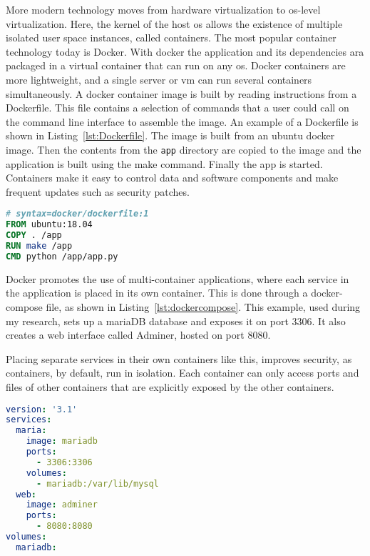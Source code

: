 More modern technology moves from hardware virtualization to \gls{os}-level virtualization.
Here, the kernel of the host \gls{os} allows the existence of multiple isolated user space instances, called containers.
The most popular container technology today is Docker.
With docker the application and its dependencies ara packaged in a virtual container that can run on any \gls{os}.
Docker containers are more lightweight, and a single server or \gls{vm} can run several containers simultaneously.
A docker container image is built by reading instructions from a Dockerfile.
This file contains a selection of commands that a user could call on the command line interface to assemble the image.
An example of a Dockerfile is shown in Listing~\ref{lst:Dockerfile}.
The image is built from an ubuntu docker image. Then the contents from the \texttt{app} directory are copied to the image and the application is built using the make command. Finally the app is started.
Containers make it easy to control data and software components and make frequent updates such as security patches.

\begin{lstlisting}[language={Dockerfile},caption={Example of a Dockerfile to build and run a Python application.},label={lst:Dockerfile},xleftmargin=15pt]
# syntax=docker/dockerfile:1
FROM ubuntu:18.04
COPY . /app
RUN make /app
CMD python /app/app.py
\end{lstlisting}

Docker promotes the use of multi-container applications, where each service in the application is placed in its own container.
This is done through a docker-compose file, as shown in Listing~\ref{lst:dockercompose}.
This example, used during my research, sets up a mariaDB database and exposes it on port 3306. It also creates a web interface called Adminer, hosted on port 8080.

Placing separate services in their own containers like this, improves security, as containers, by default, run in isolation.
Each container can only access ports and files of other containers that are explicitly exposed by the other containers.

\begin{minipage}[t]{0.9\linewidth}
\begin{lstlisting}[language={YAML},caption={Example of a Dockerfile to build and run a Python application.},label={lst:dockercompose},xleftmargin=15pt]
version: '3.1'
services:
  maria:
    image: mariadb
    ports:
      - 3306:3306
    volumes:
      - mariadb:/var/lib/mysql
  web:
    image: adminer
    ports:
      - 8080:8080
volumes:
  mariadb:

\end{lstlisting}
\end{minipage}

